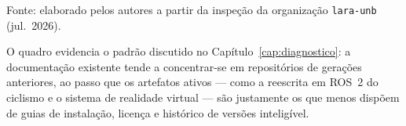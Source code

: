 \begin{apendicesenv}
\begin{table}[H]
	\vspace{4pt}
	{\footnotesize Fonte: elaborado pelos autores a partir da inspeção da organização \texttt{lara-unb} (jul.\ 2026).}
\end{table}

O quadro evidencia o padrão discutido no Capítulo~\ref{cap:diagnostico}: a documentação
existente tende a concentrar-se em repositórios de gerações anteriores, ao passo que os
artefatos ativos --- como a reescrita em ROS~2 do ciclismo e o sistema de realidade virtual ---
são justamente os que menos dispõem de guias de instalação, licença e histórico de versões
inteligível.

\end{apendicesenv}
